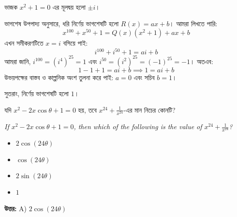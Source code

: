 \documentclass[12pt, a4paper]{article}
\begin{document}
\begin{tcolorbox}[solutionbox={সমাধান (Solution)}]
    \noindent
    ভাজক $x^2 + 1 = 0$ এর মূলদ্বয় হলো $\pm i$। 
    
    ভাগশেষ উপপাদ্য অনুসারে, ধরি নির্ণেয় ভাগশেষটি হলো $R(x) = ax + b$। আমরা লিখতে পারি:
    \[ x^{100} + x^{50} + 1 = Q(x)(x^2 + 1) + ax + b \]
    এখন সমীকরণটিতে $x = i$ বসিয়ে পাই:
    \[ i^{100} + i^{50} + 1 = ai + b \]
    আমরা জানি, $i^{100} = (i^4)^{25} = 1$ এবং $i^{50} = (i^2)^{25} = (-1)^{25} = -1$। অতএব:
    \[ 1 - 1 + 1 = ai + b \implies 1 = ai + b \]
    উভয়পক্ষের বাস্তব ও কাল্পনিক অংশ তুলনা করে পাই: $a = 0$ এবং সচিব $b = 1$। 
    
    সুতরাং, নির্ণেয় ভাগশেষটি হলো $1$।
\end{tcolorbox}

\vspace{1em}

\begin{tcolorbox}[questionbox={প্রশ্ন (Question) 48}]
    \noindent
    যদি $x^2 - 2x\cos\theta + 1 = 0$ হয়, তবে $x^{24} + \frac{1}{x^{24}}$-এর মান নিচের কোনটি?
    
    \vspace{0.8em}
    \begin{english}
    \noindent\textit{\color{darkgray}
    If $x^2 - 2x\cos\theta + 1 = 0$, then which of the following is the value of $x^{24} + \frac{1}{x^{24}}$?
    }
    \end{english}
\end{tcolorbox}

\begin{itemize}[label={}, leftmargin=1cm, itemsep=0.5em]
    \item[\textbf{A)}] $2\cos(24\theta)$
    \item[\textbf{B)}] $\cos(24\theta)$
    \item[\textbf{C)}] $2\sin(24\theta)$
    \item[\textbf{D)}] $1$
\end{itemize}

\vspace{0.5em}
\begin{tcolorbox}[answerbox]
    \textbf{\color{success} উত্তর:} A) $2\cos(24\theta)$
\end{tcolorbox}
\vspace{1em}
\end{document}
